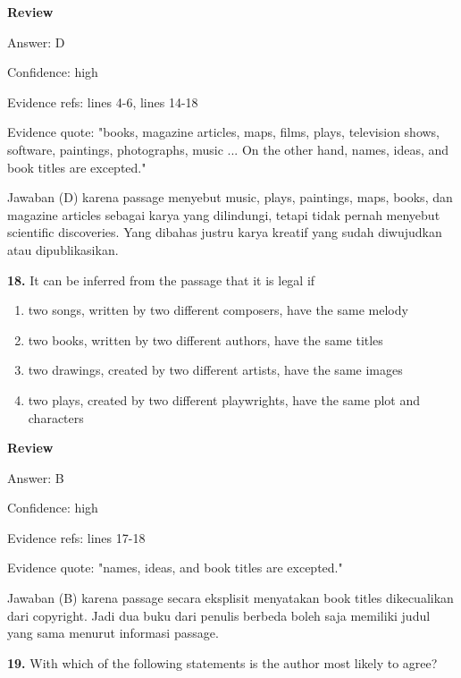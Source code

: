 \documentclass[12pt]{article}
\begin{document}
\begingroup
\setlength{\parskip}{0pt}
\setlength{\parindent}{0pt}
\textbf{Review}\par
Answer: D\par
Confidence: high\par
Evidence refs: lines 4-6, lines 14-18\par
Evidence quote: "books, magazine articles, maps, films, plays, television shows, software, paintings, photographs, music ... On the other hand, names, ideas, and book titles are excepted."\par
Jawaban (D) karena passage menyebut music, plays, paintings, maps, books, dan magazine articles sebagai karya yang dilindungi, tetapi tidak pernah menyebut scientific discoveries. Yang dibahas justru karya kreatif yang sudah diwujudkan atau dipublikasikan.\par
\endgroup
\par
\vspace{0.25\baselineskip}
\noindent\textbf{18.} It can be inferred from the passage that it is legal if
\begin{enumerate}[label=(\Alph*),leftmargin=*,itemsep=0.2em]
\item two songs, written by two different composers, have the same melody
\item two books, written by two different authors, have the same titles
\item two drawings, created by two different artists, have the same images
\item two plays, created by two different playwrights, have the same plot and characters
\end{enumerate}
\par
\begingroup
\setlength{\parskip}{0pt}
\setlength{\parindent}{0pt}
\textbf{Review}\par
Answer: B\par
Confidence: high\par
Evidence refs: lines 17-18\par
Evidence quote: "names, ideas, and book titles are excepted."\par
Jawaban (B) karena passage secara eksplisit menyatakan book titles dikecualikan dari copyright. Jadi dua buku dari penulis berbeda boleh saja memiliki judul yang sama menurut informasi passage.\par
\endgroup
\par
\vspace{0.25\baselineskip}
\noindent\textbf{19.} With which of the following statements is the author most likely to agree?
\end{document}
